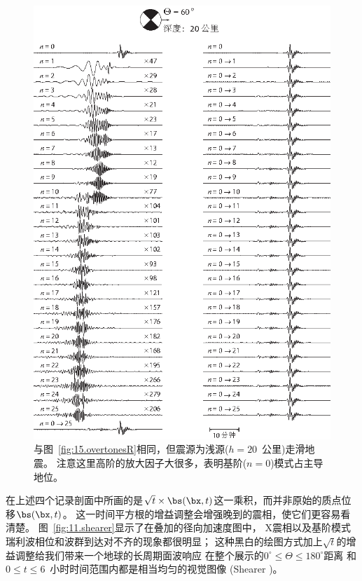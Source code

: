 \begin{figure}[!t]
\begin{center}
\includegraphics{../figures/chap11/fig18.eps}
\end{center}
\caption[overtonesR2]{
\label{fig:15.overtonesR2}
与图~\ref{fig:15.overtonesR}相同，但震源为浅源($h=20$~公里)走滑地震。
注意这里高阶的放大因子大很多，表明基阶($n=0$)模式占主导地位。
}
\end{figure}
在上述四个记录剖面中所画的是$\sqrt{t}\times\bs(\bx,t)$这一乘积，而并非原始的质点位移$\bs(\bx,t)$。
这一时间平方根的增益调整会增强晚到的震相，使它们更容易看清楚。
图~\ref{fig:11.shearer}显示了在叠加的径向加速度图中，
X震相以及基阶模式瑞利波相位和波群到达对不齐的现象都很明显；
这种黑白的绘图方式加上$\sqrt{t}$的增益调整给我们带来一个地球的长周期面波响应
在整个展示的$0^{\circ}\leq\Theta\leq 180^{\circ}$距离
和 $0\leq t\leq 6$~小时时间范围内都是相当均匀的视觉图像
(Shearer \citeyear{shearer94a})。

